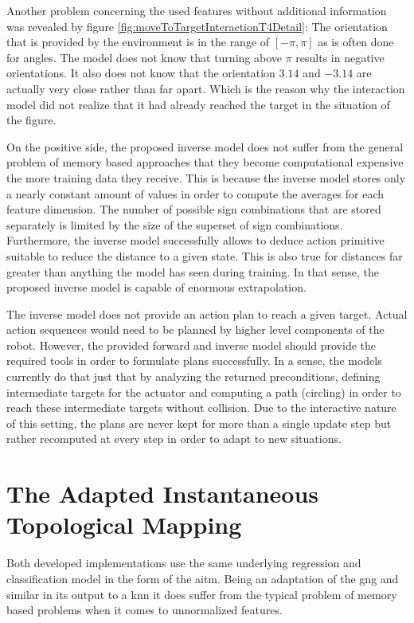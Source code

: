 Another problem concerning the used features without additional information was revealed by figure \ref{fig:moveToTargetInteractionT4Detail}: The orientation that is provided by the environment is in the range of $[-\pi,\pi]$ as is often done for angles. The model does not know that turning above $\pi$ results in negative orientations. It also does not know that the orientation $3.14$ and $-3.14$ are actually very close rather than far apart. Which is the reason why the interaction model did not realize that it had already reached the target in the situation of the figure. 

On the positive side, the proposed inverse model does not suffer from the general problem of memory based approaches that they become computational expensive the more training data they receive. This is because the inverse model stores only a nearly constant amount of values in order to compute the averages for each feature dimension. The number of possible sign combinations that are stored separately is limited by the size of the superset of sign combinations. Furthermore, the inverse model successfully allows to deduce action primitive suitable to reduce the distance to a given state. This is also true for distances far greater than anything the model has seen during training. In that sense, the proposed inverse model is capable of enormous extrapolation.

The inverse model does not provide an action plan to reach a given target. Actual action sequences would need to be planned by higher level components of the robot. 
However, the provided forward and inverse model should provide the required tools in order to formulate plans successfully.
In a sense, the models currently do that just that by analyzing the returned preconditions, defining intermediate targets for the actuator and computing a path (circling) in order to reach these intermediate targets without collision. Due to the interactive nature of this setting, the plans are never kept for more than a single update step but rather recomputed at every step in order to adapt to new situations.

\section{The Adapted Instantaneous Topological Mapping} %

Both developed implementations use the same underlying regression and classification model in the form of the \gls{aitm}. Being an adaptation of the \gls{gng} and similar in its output to a \gls{knn} it does suffer from the typical problem of memory based problems when it comes to unnormalized features. 

